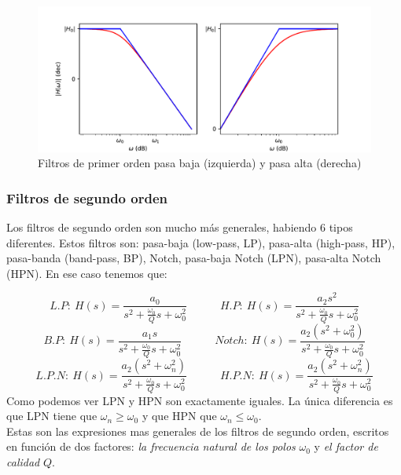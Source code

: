 \documentclass[11pt]{article} %
\newcommand{\tquad}{\quad \quad \quad}
\begin{document}
\begin{figure}[h!] \centering
\includegraphics[scale=0.8]{2.4-1orden.pdf}
\caption{Filtros de primer orden pasa baja (izquierda) y pasa alta (derecha)}
\label{Fig:2.08}
\end{figure}

\subsubsection{Filtros de segundo orden}

Los filtros de segundo orden son mucho más generales, habiendo 6 tipos diferentes. Estos filtros son: pasa-baja (low-pass, LP), pasa-alta (high-pass, HP), pasa-banda (band-pass, BP), Notch, pasa-baja Notch (LPN), pasa-alta Notch (HPN).  En ese caso tenemos que:

\begin{equation}
L.P:  \ H(s) = \dfrac{a_0}{s^2 + \frac{\omega_0}{Q}s + \omega_0^2} \tquad  
H.P:  \ H(s) = \dfrac{a_2 s^2}{s^2+ \frac{\omega_0}{Q} s + \omega_0^2}  
\end{equation}
\begin{equation}
B.P:  \ H(s) = \dfrac{a_1 s}{s^2+ \frac{\omega_0}{Q} s + \omega_0^2} \tquad
Notch:  \ H(s) = \dfrac{a_2 (s^2 + \omega_0^2)}{s^2+ \frac{\omega_0}{Q}s + \omega_0^2}   
\end{equation}
\begin{equation}
L.P.N:  \ H(s) = \dfrac{a_2 (s^2 + \omega_n^2)}{s^2+\frac{\omega_0}{Q}s+ \omega_0^2}  \tquad
H.P.N:  \ H(s) = \dfrac{a_2 (s^2 + \omega_n^2)}{s^2+\frac{\omega_0}{Q}s+ \omega_0^2} 
\end{equation}
Como podemos ver LPN y HPN son exactamente iguales. La única diferencia es que LPN tiene que $\omega_n \geq \omega_0$ y que HPN que $\omega_n \leq \omega_0$. \\

Estas son las expresiones mas generales de los filtros de segundo orden, escritos en función de dos factores: \textit{la frecuencia natural de los polos} $\omega_0$ y \textit{el factor de calidad} $Q$.
\end{document}
